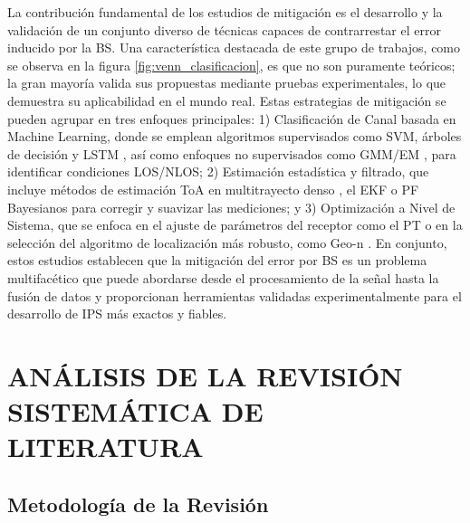 La contribución fundamental de los estudios de mitigación es el desarrollo y la validación de un conjunto diverso de técnicas capaces de contrarrestar el error inducido por la BS. Una característica destacada de este grupo de trabajos, como se observa en la figura \ref{fig:venn_clasificacion}, es que no son puramente teóricos; la gran mayoría valida sus propuestas mediante pruebas experimentales, lo que demuestra su aplicabilidad en el mundo real. Estas estrategias de mitigación se pueden agrupar en tres enfoques principales: 1) Clasificación de Canal basada en Machine Learning, donde se emplean algoritmos supervisados como SVM, árboles de decisión y LSTM \cite{ref20}, así como enfoques no supervisados como GMM/EM \cite{Fan2019}, para identificar condiciones LOS/NLOS; 2) Estimación estadística y filtrado, que incluye métodos de estimación ToA en multitrayecto denso \cite{ref11}, el EKF \cite{ref4} o PF Bayesianos \cite{Falcone2012} para corregir y suavizar las mediciones; y 3) Optimización a Nivel de Sistema, que se enfoca en el ajuste de parámetros del receptor como el PT \cite{ref18} o en la selección del algoritmo de localización más robusto, como Geo-n \cite{Schimtt2019}. En conjunto, estos estudios establecen que la mitigación del error por BS es un problema multifacético que puede abordarse desde el procesamiento de la señal hasta la fusión de datos y proporcionan herramientas validadas experimentalmente para el desarrollo de IPS más exactos y fiables.



\section{ANÁLISIS DE LA REVISIÓN SISTEMÁTICA DE LITERATURA}
\label{sec:analisis_estado_arte}

\subsection{Metodología de la  Revisión}


